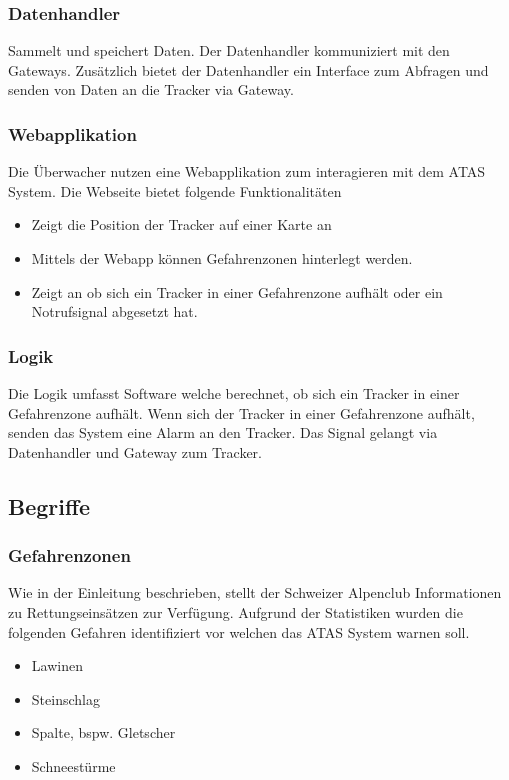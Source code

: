 \documentclass[11pt,english,german]{report}
\theoremstyle{definition}
\begin{document}
\subsubsection{Datenhandler}
Sammelt und speichert Daten. Der Datenhandler kommuniziert mit den Gateways. Zusätzlich bietet der Datenhandler ein Interface zum Abfragen und senden von Daten an die Tracker via Gateway.

\subsubsection{Webapplikation}
Die Überwacher nutzen eine Webapplikation zum interagieren mit dem ATAS System. Die Webseite bietet folgende Funktionalitäten
\begin{itemize}
	\item
		Zeigt die Position der Tracker auf einer Karte an 
	\item
		Mittels der Webapp können Gefahrenzonen hinterlegt werden.
	\item 
		Zeigt an ob sich ein Tracker in einer Gefahrenzone aufhält oder ein Notrufsignal abgesetzt hat.	
\end{itemize}

\subsubsection{Logik}
Die Logik umfasst Software welche berechnet, ob sich ein Tracker in einer Gefahrenzone aufhält. Wenn sich der Tracker in einer Gefahrenzone aufhält, senden das System eine Alarm an den Tracker. Das Signal gelangt via Datenhandler und Gateway zum Tracker.

\subsection{Begriffe}
\subsubsection{Gefahrenzonen}
Wie in der Einleitung beschrieben, stellt der Schweizer Alpenclub Informationen zu Rettungseinsätzen zur Verfügung. Aufgrund der Statistiken wurden die folgenden Gefahren identifiziert vor welchen das ATAS System warnen soll.
\begin{itemize}
	\item Lawinen
	\item Steinschlag
	\item Spalte, bspw. Gletscher
	\item Schneestürme
\end{itemize}
\end{document}
